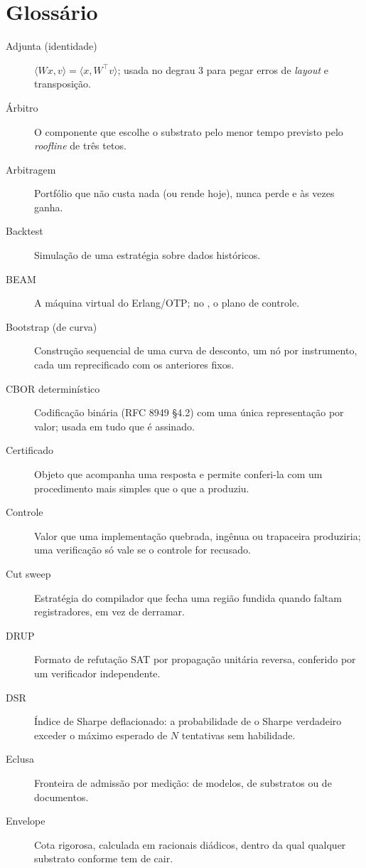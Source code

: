 \chapter{Glossário}\label{ap:glossario}

\begin{description}
  \item[Adjunta (identidade)] $\langle Wx, v\rangle = \langle x, W^\top v\rangle$; usada no degrau 3 para pegar erros de \textit{layout} e transposição.
  \item[Árbitro] O componente que escolhe o substrato pelo menor tempo previsto pelo \textit{roofline} de três tetos.
  \item[Arbitragem] Portfólio que não custa nada (ou rende hoje), nunca perde e às vezes ganha.
  \item[Backtest] Simulação de uma estratégia sobre dados históricos.
  \item[BEAM] A máquina virtual do Erlang/OTP; no \vapor{}, o plano de controle.
  \item[Bootstrap (de curva)] Construção sequencial de uma curva de desconto, um nó por instrumento, cada um reprecificado com os anteriores fixos.
  \item[CBOR determinístico] Codificação binária (RFC 8949 §4.2) com uma única representação por valor; usada em tudo que é assinado.
  \item[Certificado] Objeto que acompanha uma resposta e permite conferi-la com um procedimento mais simples que o que a produziu.
  \item[Controle] Valor que uma implementação quebrada, ingênua ou trapaceira produziria; uma verificação só vale se o controle for recusado.
  \item[Cut sweep] Estratégia do compilador que fecha uma região fundida quando faltam registradores, em vez de derramar.
  \item[DRUP] Formato de refutação SAT por propagação unitária reversa, conferido por um verificador independente.
  \item[DSR] Índice de Sharpe deflacionado: a probabilidade de o Sharpe verdadeiro exceder o máximo esperado de $N$ tentativas sem habilidade.
  \item[Eclusa] Fronteira de admissão por medição: de modelos, de substratos ou de documentos.
  \item[Envelope] Cota rigorosa, calculada em racionais diádicos, dentro da qual qualquer substrato conforme tem de cair.

\end{description}
